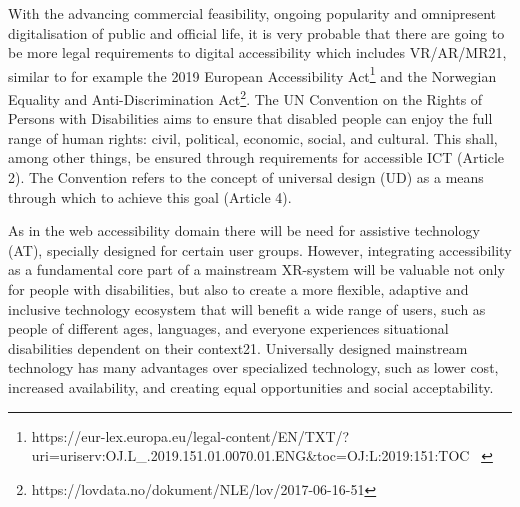 With the advancing commercial feasibility, ongoing popularity and omnipresent digitalisation of public and official
life, it is very probable that there are going to be more legal requirements to digital accessibility which includes
VR/AR/MR21, similar to for example the 2019 European Accessibility
Act\footnote{https://eur-lex.europa.eu/legal-content/EN/TXT/?uri=uriserv:OJ.L\_.2019.151.01.0070.01.ENG\&toc=OJ:L:2019:151:TOC
\ } and the Norwegian Equality and Anti-Discrimination Act\footnote{https://lovdata.no/dokument/NLE/lov/2017-06-16-51}.
The UN Convention on the Rights of Persons with Disabilities aims to ensure that disabled people can enjoy the full
range of human rights: civil, political, economic, social, and cultural. This shall, among other things, be ensured
through requirements for accessible ICT (Article 2). The Convention refers to the concept of universal design (UD) as a
means through which to achieve this goal (Article 4). 

As in the web accessibility domain there will be need for assistive technology (AT), specially designed for certain user
groups. However, integrating accessibility as a fundamental core part of a mainstream XR-system will be valuable not
only for people with disabilities, but also to create a more flexible, adaptive and inclusive technology ecosystem that
will benefit a wide range of users, such as people of different ages, languages, and everyone experiences situational
disabilities dependent on their context21. Universally designed mainstream technology has many advantages over
specialized technology, such as lower cost, increased availability, and creating equal opportunities and social
acceptability. 




